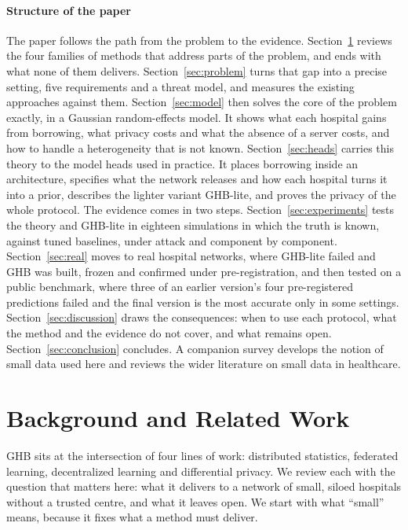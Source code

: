 \documentclass[acmsmall,screen,review]{acmart}
\theoremstyle{acmdefinition}
\begin{document}
\paragraph{Structure of the paper} The paper follows the path from the problem to the evidence. Section~\ref{sec:related} reviews the four families of methods that address parts of the problem, and ends with what none of them delivers. Section~\ref{sec:problem} turns that gap into a precise setting, five requirements and a threat model, and measures the existing approaches against them. Section~\ref{sec:model} then solves the core of the problem exactly, in a Gaussian random-effects model. It shows what each hospital gains from borrowing, what privacy costs and what the absence of a server costs, and how to handle a heterogeneity that is not known. Section~\ref{sec:heads} carries this theory to the model heads used in practice. It places borrowing inside an architecture, specifies what the network releases and how each hospital turns it into a prior, describes the lighter variant GHB-lite, and proves the privacy of the whole protocol. The evidence comes in two steps. Section~\ref{sec:experiments} tests the theory and GHB-lite in eighteen simulations in which the truth is known, against tuned baselines, under attack and component by component. Section~\ref{sec:real} moves to real hospital networks, where GHB-lite failed and GHB was built, frozen and confirmed under pre-registration, and then tested on a public benchmark, where three of an earlier version's four pre-registered predictions failed and the final version is the most accurate only in some settings. Section~\ref{sec:discussion} draws the consequences: when to use each protocol, what the method and the evidence do not cover, and what remains open. Section~\ref{sec:conclusion} concludes. A companion survey \cite{simoes2026collectively} develops the notion of small data used here and reviews the wider literature on small data in healthcare.

\section{Background and Related Work}\label{sec:related}

GHB sits at the intersection of four lines of work: distributed statistics, federated learning, decentralized learning and differential privacy. We review each with the question that matters here: what it delivers to a network of small, siloed hospitals without a trusted centre, and what it leaves open. We start with what ``small'' means, because it fixes what a method must deliver.
\end{document}
